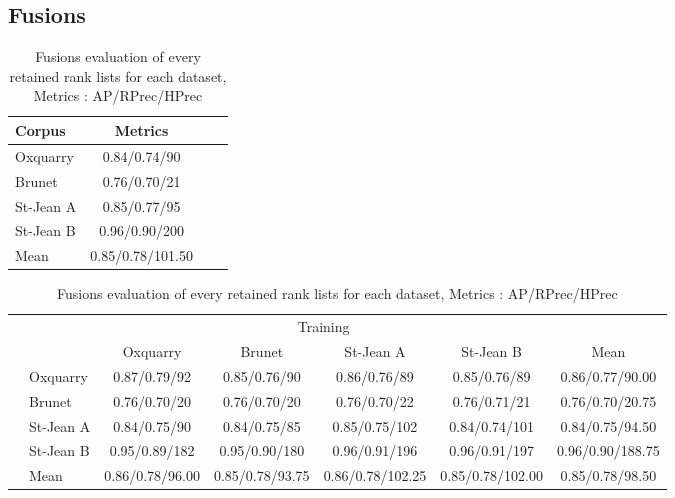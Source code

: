\subsection{Fusions}

\begin{table}[H]
  \centering
  \caption{Fusions evaluation of every retained rank lists for each dataset, Metrics : AP/RPrec/HPrec}
  \label{tab:fusions_scores}

  \begin{tabular}{l c c c}
    \toprule
    Corpus         & Metrics \\
    \midrule
    Oxquarry       & 0.84/0.74/90 \\
    Brunet         & 0.76/0.70/21 \\
    St-Jean A      & 0.85/0.77/95 \\
    St-Jean B      & 0.96/0.90/200 \\
    \midrule
    Mean           & 0.85/0.78/101.50 \\
    \bottomrule
  \end{tabular}

  \vspace{0.5cm}

  \begin{tabular}{l l| c c c c|c}
    \toprule
    \multicolumn{2}{c}{\multirow{2}{*}{}} & \multicolumn{4}{c}{Training} \\
    \multicolumn{2}{c}{} & Oxquarry & Brunet & St-Jean A & St-Jean B & Mean \\
    \midrule
    \parbox[t]{2mm}{}
    & Oxquarry  & 0.87/0.79/92 & 0.85/0.76/90 & 0.86/0.76/89 & 0.85/0.76/89 & 0.86/0.77/90.00 \\
    & Brunet    & 0.76/0.70/20 & 0.76/0.70/20 & 0.76/0.70/22 & 0.76/0.71/21 & 0.76/0.70/20.75 \\
    & St-Jean A & 0.84/0.75/90 & 0.84/0.75/85 & 0.85/0.75/102 & 0.84/0.74/101 & 0.84/0.75/94.50 \\
    & St-Jean B & 0.95/0.89/182 & 0.95/0.90/180 & 0.96/0.91/196 & 0.96/0.91/197 & 0.96/0.90/188.75 \\
    \midrule
    & Mean      & 0.86/0.78/96.00 & 0.85/0.78/93.75 & 0.86/0.78/102.25 & 0.85/0.78/102.00 & 0.85/0.78/98.50 \\
    \bottomrule
  \end{tabular}

\end{table}
